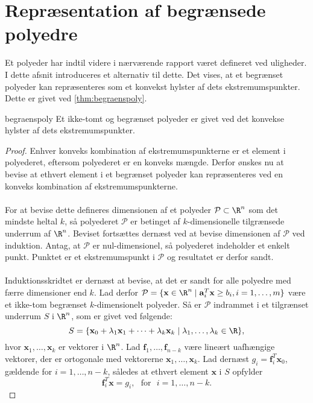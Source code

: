 \section{Repræsentation af begrænsede polyedre}
%
Et polyeder har indtil videre i nærværende rapport været defineret ved uligheder. 
I dette afsnit introduceres et alternativ til dette. 
Det vises, at et begrænset polyeder kan repræsenteres som et konvekst hylster af dets ekstremumspunkter. 
Dette er givet ved \ref{thm:begraenspoly}. 
\begin{thm}{}{begraenspoly}
Et ikke-tomt og begrænset polyeder er givet ved det konvekse hylster af dets ekstremumspunkter.
\end{thm}
%
\begin{proof}
Enhver konveks kombination af ekstremumspunkterne er et element i polyederet, eftersom polyederet er en konveks mængde. 
Derfor ønskes nu at bevise at ethvert element i et begrænset polyeder kan repræsenteres ved en konveks kombination af ekstremumspunkterne. 
\\\\
For at bevise dette defineres dimensionen af et polyeder $\mathcal{P} \subset \R^n$ som det mindste heltal $k$, så polyederet $\mathcal{P}$ er betinget af $k$-dimensionelle tilgrænsede underrum af $\R^n$. 
Beviset fortsættes dernæst ved at bevise dimensionen af $\mathcal{P}$ ved induktion. 
Antag, at $\mathcal{P}$ er nul-dimensionel, så polyederet indeholder et enkelt punkt. 
Punktet er et ekstremumspunkt i $\mathcal{P}$ og resultatet er derfor sandt. \\\\
Induktionsskridtet er dernæst at bevise, at det er sandt for alle polyedre med færre dimensioner end $k$. Lad derfor $\mathcal{P} = \{\textbf{x} \in \R^n \mid \mathbf{a}_{i}^T \textbf{x} \geq b_i, i=1,\ldots,m\}$ være et ikke-tom begrænset $k$-dimensionelt polyeder. 
Så er $\mathcal{P}$ indrammet i et tilgrænset underrum $S$ i $\R^n$, som er givet ved følgende: \\
$$S = \{\textbf{x}_0+\lambda_1 \textbf{x}_1+\cdots+\lambda_k\textbf{x}_k \mid \lambda_1,\ldots,\lambda_k \in \R\},$$
hvor $\textbf{x}_1,\ldots,\textbf{x}_k$ er vektorer i $\R^n$. 
Lad $\textbf{f}_1,\ldots,\textbf{f}_{n-k}$ være lineært uafhængige vektorer, der er ortogonale med vektorerne $\textbf{x}_1,\ldots,\textbf{x}_k$. 
Lad dernæst $g_i=\mathbf{f}_{i}^T \textbf{x}_0$, gældende for $i=1,\ldots,n-k$, således at ethvert element $\textbf{x}$ i $S$ opfylder 
$$\mathbf{f}_{i}^T \textbf{x}=g_i, \text{     } \text{for} \text{     } i=1,\ldots,n-k.$$ 

\end{proof}
